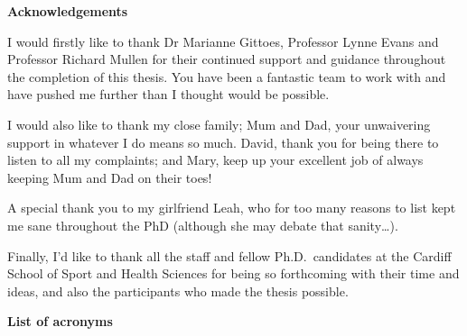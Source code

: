 \documentclass[
  english,
  man,floatsintext]{apa6}
\begin{document}
\clearpage\mbox{}\thispagestyle{empty}

\begin{center}
\textbf{Acknowledgements}
\end{center}

I would firstly like to thank Dr Marianne Gittoes, Professor Lynne Evans and Professor Richard Mullen for their continued support and guidance throughout the completion of this thesis. You have been a fantastic team to work with and have pushed me further than I thought would be possible.

I would also like to thank my close family; Mum and Dad, your unwaivering support in whatever I do means so much. David, thank you for being there to listen to all my complaints; and Mary, keep up your excellent job of always keeping Mum and Dad on their toes!

A special thank you to my girlfriend Leah, who for too many reasons to list kept me sane throughout the PhD (although she may debate that sanity\ldots).

Finally, I'd like to thank all the staff and fellow Ph.D.~candidates at the Cardiff School of Sport and Health Sciences for being so forthcoming with their time and ideas, and also the participants who made the thesis possible.

\clearpage

\begin{flushleft}
{
\tableofcontents
}
\end{flushleft}

\clearpage

\begin{flushleft}
{

}
\end{flushleft}

\clearpage

\begin{flushleft}
{

}
\end{flushleft}

\clearpage

\begin{center}
\textbf{List of acronyms}
\end{center}

\end{document}
